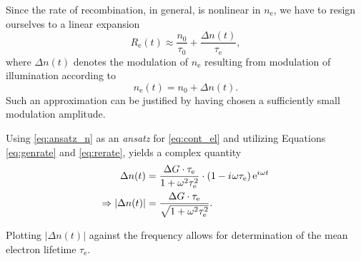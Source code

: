 Since the rate of recombination, in general, is nonlinear in $n_\text{e}$, we have to resign ourselves to a linear expansion
\begin{equation}\label{eq:rerate}
	R_\text{e}(t)\approx \frac{n_0}{\tau_0} + \frac{\Delta n(t)}{\tau_\text{e}},
\end{equation}
where $\Delta n(t)$ denotes the modulation of $n_\text{e}$ resulting from modulation of illumination according to
\begin{equation}\label{eq:ansatz_n}
	n_\text{e}(t) = n_0 + \Delta n(t).
\end{equation}
Such an approximation can be justified by having chosen a sufficiently small modulation amplitude.

Using \autoref{eq:ansatz_n} as an \textit{ansatz} for \autoref{eq:cont_el} and utilizing Equations \ref{eq:genrate} and \ref{eq:rerate}, yields a complex quantity
\begin{align}
	\Delta n(t) &= \frac{\Delta G\cdot\tau_\text{e}}{1+\omega^2\tau_\text{e}^2}\cdot\left(1 -{i\mkern1mu}\omega\tau_\text{e}\right)\mathrm{e}^{{i\mkern1mu}\omega t} \nonumber \\
	\Rightarrow |\Delta n(t)| &= \frac{\Delta G\cdot\tau_\text{e}}{\sqrt{1+\omega^2\tau_\text{e}^2}}.\label{eq:freq-dependence}
\end{align}

Plotting $|\Delta n(t)|$ against the frequency allows for determination of the mean electron lifetime $\tau_\text{e}$.
